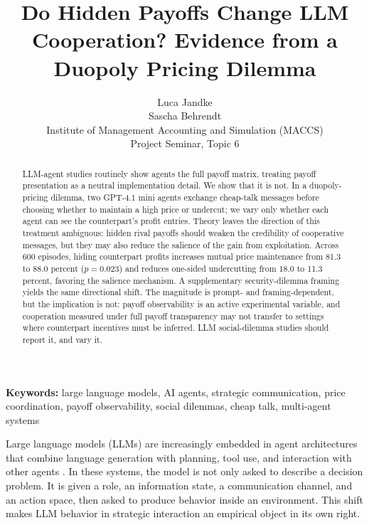 \documentclass[11pt,a4paper]{article}
\title{\textbf{Do Hidden Payoffs Change LLM Cooperation? Evidence from a Duopoly Pricing Dilemma}}
\author{Luca Jandke \\ Sascha Behrendt \\ Institute of Management Accounting and Simulation (MACCS) \\ Project Seminar, Topic 6}
\date{}
\makeatletter
\renewcommand\section{\@startsection{section}{1}{\z@}{9pt}{6pt}{\normalfont\fontsize{12pt}{14pt}\bfseries}}
\makeatother
\begin{document}
\maketitle

\begin{abstract}
\begin{sloppypar}
LLM-agent studies routinely show agents the full payoff matrix, treating payoff presentation as a neutral implementation detail. We show that it is not. In a duopoly-pricing dilemma, two GPT-4.1 mini agents exchange cheap-talk messages before choosing whether to maintain a high price or undercut; we vary only whether each agent can see the counterpart's profit entries. Theory leaves the direction of this treatment ambiguous: hidden rival payoffs should weaken the credibility of cooperative messages, but they may also reduce the salience of the gain from exploitation. Across 600 episodes, hiding counterpart profits increases mutual price maintenance from 81.3 to 88.0 percent ($p = 0.023$) and reduces one-sided undercutting from 18.0 to 11.3 percent, favoring the salience mechanism. A supplementary security-dilemma framing yields the same directional shift. The magnitude is prompt- and framing-dependent, but the implication is not: payoff observability is an active experimental variable, and cooperation measured under full payoff transparency may not transfer to settings where counterpart incentives must be inferred. LLM social-dilemma studies should report it, and vary it.
\end{sloppypar}
\end{abstract}

\textbf{Keywords:} large language models, AI agents, strategic communication, price coordination, payoff observability, social dilemmas, cheap talk, multi-agent systems

\newpage

\section{Introduction}

Large language models (LLMs) are increasingly embedded in agent architectures that combine language generation with planning, tool use, and interaction with other agents \cite{yao2023react,park2023generative,wang2024survey,guo2024large}. In these systems, the model is not only asked to describe a decision problem. It is given a role, an information state, a communication channel, and an action space, then asked to produce behavior inside an environment. This shift makes LLM behavior in strategic interaction an empirical object in its own right.
\end{document}
